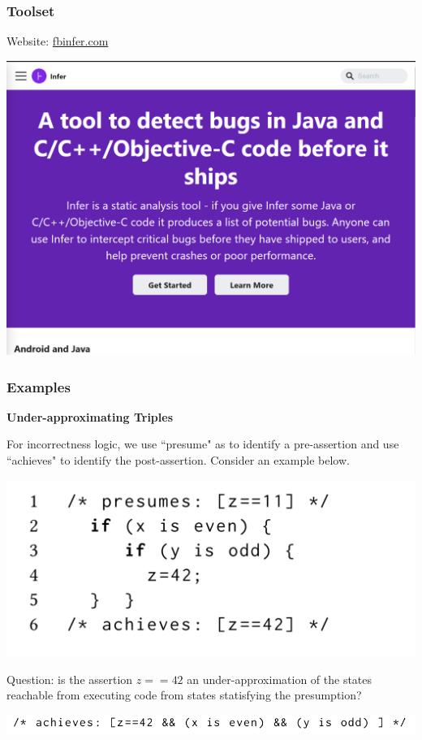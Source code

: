 \documentclass[11pt]{beamer}
\begin{document}
\begin{frame}\frametitle{Toolset}

Website: \underline{fbinfer.com}
\begin{center}
\includegraphics[scale=0.35]{infer.png}

\end{center}

\end{frame}

\begin{frame}\frametitle{Examples}
\textbf{Under-approximating Triples}

For incorrectness logic, we use ``presume" as to identify a pre-assertion and use ``achieves" to identify the post-assertion. Consider an example below.
\begin{center}
\includegraphics[scale = 0.25]{4.PNG}

\end{center}
Question: is the assertion $z==42$ an under-approximation of the states reachable from executing code from states statisfying the presumption?
\begin{center}
\includegraphics[scale = 0.35]{3.PNG}
\end{center}
\end{frame}
\end{document}
